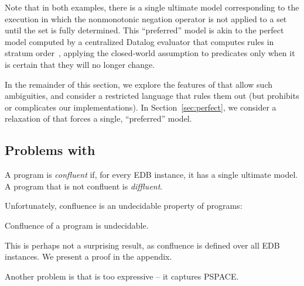 Note that in both examples, there is a single ultimate model corresponding to
the execution in which the nonmonotonic negation operator is not applied to a
set until the set is fully determined.  This ``preferred'' model is akin to the
perfect model computed by a centralized Datalog evaluator that computes rules in
stratum order~\cite{ullman}, applying the closed-world assumption to predicates
only when it is certain that they will no longer change.

In the remainder of this section, we explore the features of \lang that allow
such ambiguities, and consider a restricted language \slang that rules them out
(but prohibits or complicates our implementations).  In
Section~\ref{sec:perfect}, we consider a relaxation of \slang that forces a
single, ``preferred'' model.

\subsection{Problems with \large \bf \lang}

\begin{definition}
  A \lang program is {\em confluent} if, for every EDB instance, it has a single ultimate model.  A program that is not confluent is {\em diffluent}.
\end{definition}


Unfortunately, confluence is an undecidable property of \lang programs:

\begin{lemma}
\label{lem:confluence-undecidable}
Confluence of a \lang program is undecidable.
\end{lemma}
This is perhaps not a surprising result, as confluence is defined over all EDB instances.  We present a proof in the appendix.


Another problem is that \lang is too expressive -- it captures PSPACE.

